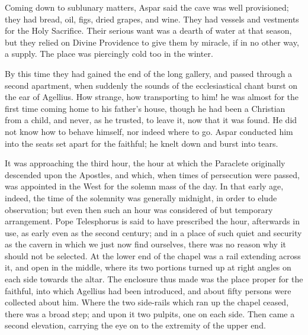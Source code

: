 Coming down to sublunary matters, Aspar said the cave was well
provisioned; they had bread, oil, figs, dried grapes, and wine. They
had vessels and vestments for the Holy Sacrifice. Their serious want
was a dearth of water at that season, but they relied on Divine
Providence to give them by miracle, if in no other way, a supply. The
place was piercingly cold too in the winter.

By this time they had gained the end of the long gallery, and
passed through a second apartment, when suddenly the sounds of the
ecclesiastical chant burst on the ear of Agellius. How strange, how
transporting to him! he was almost for the first time coming home to
his father's house, though he had been a Christian from a child, and
never, as he trusted, to leave it, now that it was found. He did not
know how to behave himself, nor indeed where to go. Aspar conducted
him into the seats set apart for the faithful; he knelt down and burst
into tears.

It was approaching the third hour, the hour at which the Paraclete
originally descended upon the Apostles, and which, when times of
persecution were passed, was appointed in the West for the solemn mass
of the day. In that early age, indeed, the time of the solemnity was
generally midnight, in order to elude observation; but even then such
an hour was considered of but temporary arrangement. Pope Telesphorus
is said to have prescribed the hour, afterwards in use, as early even
as the second century; and in a place of such quiet and security as
the cavern in which we just now find ourselves, there was no reason
why it should not be selected. At the lower end of the chapel was a
rail extending across it, and open in the middle, where its two
portions turned up at right angles on each side towards the altar. The
enclosure thus made was the place proper for the faithful, into which
Agellius had been introduced, and about fifty persons were collected
about him. Where the two side-rails which ran up the chapel ceased,
there was a broad step; and upon it two pulpits, one on each side.
Then came a second elevation, carrying the eye on to the extremity of
the upper end.

